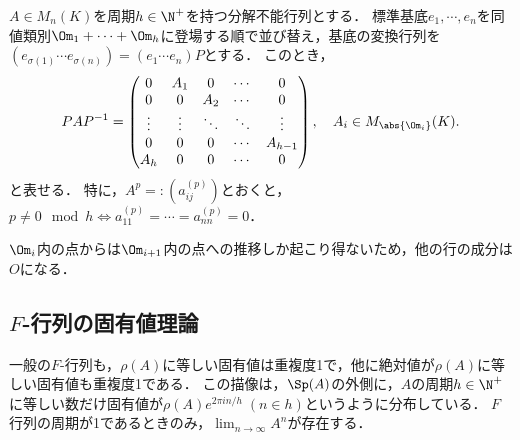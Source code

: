 \documentclass[uplatex, dvipdfmx]{jsreport}
\begin{document}
\begin{theorem}[分解不能行列の周期標準形]
    $A\in M_n(K)$を周期$h\in\N^+$を持つ分解不能行列とする．
    標準基底$e_1,\cdots,e_n$を同値類別$\Om_1+\cdots+\Om_h$に登場する順で並び替え，基底の変換行列を$(e_{\sigma(1)}\cdots e_{\sigma(n)})=(e_1\cdots e_n)P$とする．
    このとき，
    \[PAP^{-1}=\begin{pmatrix}0&A_1&0&\cdots&0\\0&0&A_2&\cdots&0\\\vdots&\vdots&\ddots&\ddots&\vdots\\0&0&0&\cdots&A_{h-1}\\A_h&0&0&\cdots&0\end{pmatrix},\quad A_i\in M_{\abs{\Om_i}}(K).\]
    と表せる．
    特に，$A^p=:(a_{ij}^{(p)})$とおくと，$p\ne0\mod h\Leftrightarrow a_{11}^{(p)}=\cdots=a_{nn}^{(p)}=0$．
\end{theorem}
\begin{remarks}
    $\Om_i$内の点からは$\Om_{i+1}$内の点への推移しか起こり得ないため，他の行の成分は$O$になる．
\end{remarks}

\subsection{$F$-行列の固有値理論}

\begin{tcolorbox}[colframe=ForestGreen, colback=ForestGreen!10!white,breakable,colbacktitle=ForestGreen!40!white,coltitle=black,fonttitle=\bfseries\sffamily,
    title=]
    一般の$F$-行列も，$\rho(A)$に等しい固有値は重複度1で，他に絶対値が$\rho(A)$に等しい固有値も重複度1である．
    この描像は，$\Sp(A)$の外側に，$A$の周期$h\in\N^+$に等しい数だけ固有値が$\rho(A)e^{2\pi in/h}\;(n\in h)$というように分布している．
    $F$行列の周期が1であるときのみ，$\lim_{n\to\infty}A^n$が存在する．
\end{tcolorbox}
\end{document}

